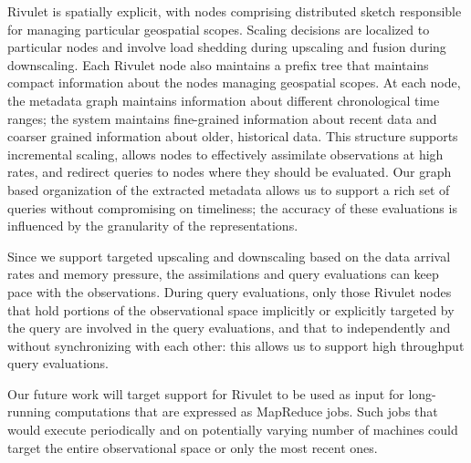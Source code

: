 \begin{description}[leftmargin=*]
\item[RQ-3:] Rivulet is spatially explicit, with nodes comprising distributed sketch responsible for managing particular geospatial scopes. Scaling decisions are localized to particular nodes and involve load shedding during upscaling and fusion during downscaling. Each Rivulet node also maintains a prefix tree that maintains compact information about the nodes managing geospatial scopes. At each node, the metadata graph maintains information about different chronological time ranges; the system maintains fine-grained information about recent data and coarser grained information about older, historical data. This structure supports incremental scaling, allows nodes to effectively assimilate observations at high rates, and redirect queries to nodes where they should be evaluated. Our graph based organization of the extracted metadata allows us to support a rich set of queries without compromising on timeliness; the accuracy of these evaluations is influenced by the granularity of the representations.  

\item[RQ-4:] Since we support targeted upscaling and downscaling based on the data arrival rates and memory pressure, the assimilations and query evaluations can keep pace with the observations. During query evaluations,  only those Rivulet nodes that hold portions of the observational space implicitly or explicitly targeted by the query are involved in the query evaluations, and that to independently and without synchronizing with each other: this allows us to support high throughput query evaluations.

Our future work will target support for Rivulet to be used as input for long-running computations that are expressed as MapReduce jobs. Such jobs that would execute periodically and on potentially varying number of machines could target the entire observational space or only the most recent ones.
\end{description}